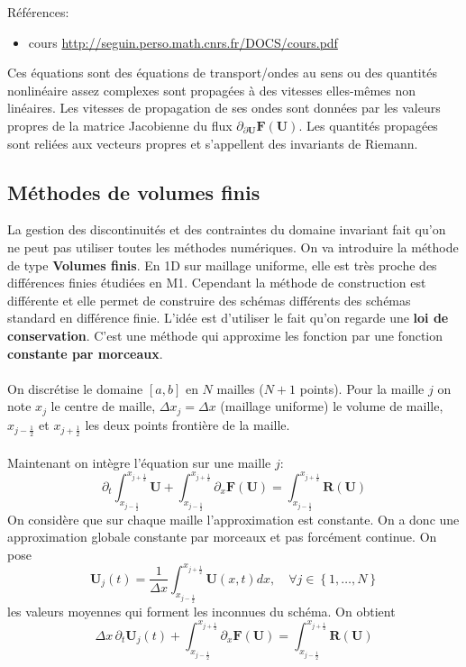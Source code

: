 \documentclass[11pt]{article}
\theoremstyle{definition}
\begin{document}
Références:
\begin{itemize}
\item cours \url{http://seguin.perso.math.cnrs.fr/DOCS/cours.pdf}
\end{itemize}
Ces équations sont des équations de transport/ondes au sens ou des quantités nonlinéaire assez complexes sont propagées à des vitesses elles-mêmes non linéaires. Les vitesses de propagation de ses ondes sont données par les valeurs propres de  la matrice Jacobienne du flux $\partial_{\partial \mathbf{U}} \mathbf{F}(\mathbf{U})$. Les quantités propagées sont reliées aux vecteurs propres et s'appellent des invariants de Riemann.
\subsection{Méthodes de volumes finis}
La gestion des discontinuités et des contraintes du domaine invariant fait qu'on ne peut pas utiliser toutes les méthodes numériques. On va introduire la méthode de type \textbf{Volumes finis}. En 1D sur maillage uniforme, elle est très proche des différences finies étudiées en M1. Cependant la méthode de construction est différente et elle permet de construire des schémas différents des schémas standard en différence finie. L'idée est d'utiliser le fait qu'on regarde une \textbf{loi de conservation}. C'est une méthode qui approxime les fonction par une fonction \textbf{constante par morceaux}. \\\\
On discrétise le domaine $[a,b]$ en $N$ mailles ($N+1$ points). Pour la maille $j$ on note $x_j$ le centre de maille, $\Delta x_j= \Delta x$ (maillage uniforme) le volume de maille, $x_{j-\frac12}$ et $x_{j+\frac12}$ les deux points frontière de la maille.\\\\
Maintenant on intègre l'équation sur une maille $j$:
$$
\partial_t  \int_{x_{j-\frac12}}^{x_{j+\frac12}}\mathbf{U}+ \int_{x_{j-\frac12}}^{x_{j+\frac12}}\partial_x \mathbf{F}(\mathbf{U}) = \int_{x_{j-\frac12}}^{x_{j+\frac12}}\mathbf{R}(\mathbf{U})
$$
On considère que sur chaque maille l'approximation est constante. On a donc une approximation globale constante par morceaux et pas forcément continue. On pose
$$
\mathbf{U}_j(t)=\frac{1}{\Delta x}\int_{x_{j-\frac12}}^{x_{j+\frac12}}\mathbf{U}(x,t) dx, \quad \forall j \in \left\{1,\ldots,N\right\}
$$
les valeurs moyennes qui forment les inconnues du schéma. On obtient
$$
\Delta x\, \partial_t \mathbf{U}_j(t)+ \int_{x_{j-\frac12}}^{x_{j+\frac12}}\partial_x \mathbf{F}(\mathbf{U}) = \int_{x_{j-\frac12}}^{x_{j+\frac12}}\mathbf{R}(\mathbf{U})
$$
\end{document}
